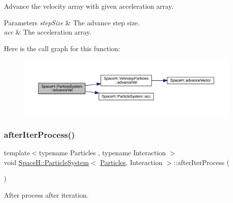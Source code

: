 Advance the velocity array with given acceleration array. 


\begin{DoxyParams}{Parameters}
{\em step\+Size} & The advance step size. \\
\hline
{\em acc} & The acceleration array. \\
\hline
\end{DoxyParams}
Here is the call graph for this function\+:
\nopagebreak
\begin{figure}[H]
\begin{center}
\leavevmode
\includegraphics[width=350pt]{class_space_h_1_1_particle_system_a1c5413658f4946e9b2246bdd09107f84_cgraph}
\end{center}
\end{figure}
\mbox{\label{class_space_h_1_1_particle_system_af31e35ad97bedb42ab85c107f1277004}} 
\subsubsection{\texorpdfstring{after\+Iter\+Process()}{afterIterProcess()}}
{\footnotesize\ttfamily template$<$typename Particles , typename Interaction $>$ \\
void \mbox{\hyperlink{class_space_h_1_1_particle_system}{Space\+H\+::\+Particle\+System}}$<$ \mbox{\hyperlink{struct_space_h_1_1_particles}{Particles}}, Interaction $>$\+::after\+Iter\+Process (\begin{DoxyParamCaption}{ }\end{DoxyParamCaption})\hspace{0.3cm}{\ttfamily [inline]}}



After process after iteration. 

